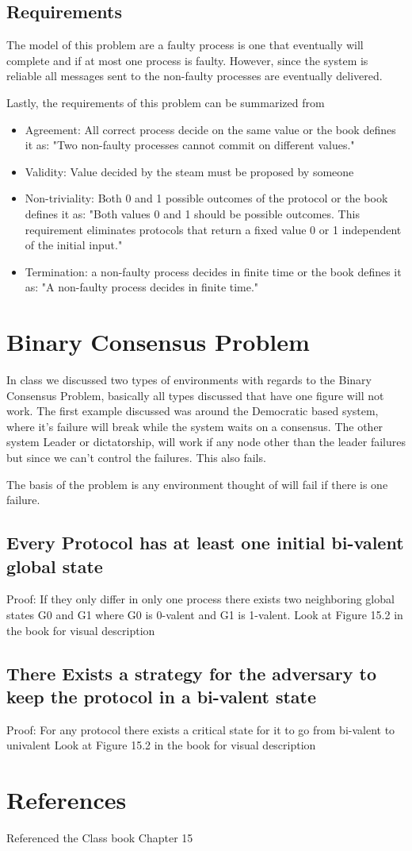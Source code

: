 \documentclass[twoside]{article}
\begin{document}
\subsection{Requirements}
  The model of this problem are a faulty process is one that eventually will complete and if at most one process is faulty. However, since the system is reliable all messages sent to the non-faulty processes are eventually delivered.

Lastly, the requirements of this problem can be summarized from 
\begin{itemize}
\item Agreement: All correct process decide on the same value or the book defines it as: "Two non-faulty processes cannot commit on different values."
  \item Validity: Value decided by the steam must be proposed by someone 
  \item Non-triviality: Both 0 and 1 possible outcomes of the protocol or the book defines it as: "Both values 0 and 1 should be possible outcomes. This requirement eliminates protocols that return a fixed value 0 or 1 independent of the initial input."
  \item Termination: a non-faulty process decides in finite time or the book defines it as: "A non-faulty process decides in finite time."
\end{itemize}
\section{Binary Consensus Problem}
  In class we discussed two types of environments with regards to the Binary Consensus Problem, basically all types discussed that have one figure will not work. The first example discussed was around the Democratic based system, where it's failure will break while the system waits on a consensus. The other system Leader or dictatorship, will work if any node other than the leader failures but since we can't control the failures. This also fails.

The basis of the problem is any environment thought of will fail if there is one failure. 
\subsection{Every Protocol has at least one initial bi-valent global state}
 Proof: If they only differ in only one process there exists two neighboring global states G0 and G1 where G0 is 0-valent and G1 is 1-valent.
Look at Figure 15.2 in the book for visual description
\subsection{There Exists a strategy for the adversary to keep the protocol in a bi-valent state}
 Proof: For any protocol there exists a critical state for it to go from bi-valent to univalent
Look at Figure 15.2 in the book for visual description
\section*{References}
 Referenced the Class book Chapter 15
\end{document}
